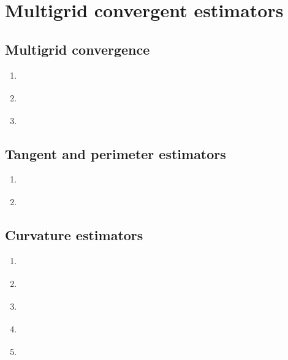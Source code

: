 \chapter{Multigrid convergent estimators}


\section{Multigrid convergence}
	\begin{enumerate}
	\item{	\cite{klette00} }		
	\item{	\cite{klette01} }			
	\item{	\cite{klette00} }			
	\end{enumerate}

\section{Tangent and perimeter estimators}
	\begin{enumerate}
		\item{ \cite{lachaud07} }
		\item{ \cite{coeurjolly12} }
	\end{enumerate}
	
\section{Curvature estimators}
	\begin{enumerate}
		\item{ \cite{coeurjolly01} }
		\item{ \cite{kerautret08} }
		\item{ \cite{coeurjolly13} }
		\item{ \cite{roussillon11} }
		\item{ \cite{schindele17} }
	\end{enumerate}
	